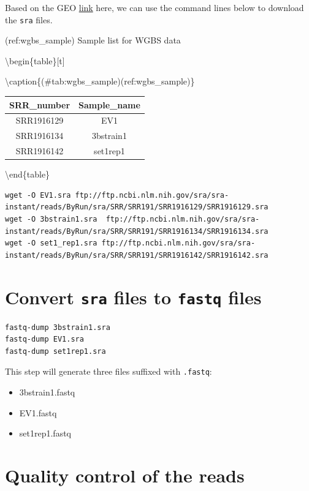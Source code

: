 \documentclass[]{book}
\providecommand{\tightlist}{%
  \setlength{\itemsep}{0pt}\setlength{\parskip}{0pt}}
\begin{document}
Based on the GEO \href{https://www.ncbi.nlm.nih.gov//geo/query/acc.cgi?acc=GSE66905}{link} here, we can use the command lines below to download the \texttt{sra} files.

(ref:wgbs\_sample) Sample list for WGBS data

\textbackslash{}begin\{table\}{[}t{]}

\textbackslash{}caption\{(\#tab:wgbs\_sample)(ref:wgbs\_sample)\}
\centering

\begin{tabular}{c|c}
\hline
SRR\_number & Sample\_name\\
\hline
SRR1916129 & EV1\\
\hline
SRR1916134 & 3bstrain1\\
\hline
SRR1916142 & set1rep1\\
\hline
\end{tabular}

\textbackslash{}end\{table\}

\begin{verbatim}
wget -O EV1.sra ftp://ftp.ncbi.nlm.nih.gov/sra/sra-instant/reads/ByRun/sra/SRR/SRR191/SRR1916129/SRR1916129.sra
wget -O 3bstrain1.sra  ftp://ftp.ncbi.nlm.nih.gov/sra/sra-instant/reads/ByRun/sra/SRR/SRR191/SRR1916134/SRR1916134.sra
wget -O set1_rep1.sra ftp://ftp.ncbi.nlm.nih.gov/sra/sra-instant/reads/ByRun/sra/SRR/SRR191/SRR1916142/SRR1916142.sra
\end{verbatim}

\hypertarget{convert-sra-files-to-fastq-files}{%
\section{\texorpdfstring{Convert \texttt{sra} files to \texttt{fastq} files}{Convert sra files to fastq files}}\label{convert-sra-files-to-fastq-files}}

\begin{verbatim}
fastq-dump 3bstrain1.sra 
fastq-dump EV1.sra 
fastq-dump set1rep1.sra 
\end{verbatim}

This step will generate three files suffixed with \texttt{.fastq}:

\begin{itemize}
\tightlist
\item
  3bstrain1.fastq
\item
  EV1.fastq
\item
  set1rep1.fastq
\end{itemize}

\hypertarget{quality-control-of-the-reads}{%
\section{Quality control of the reads}\label{quality-control-of-the-reads}}
\end{document}
